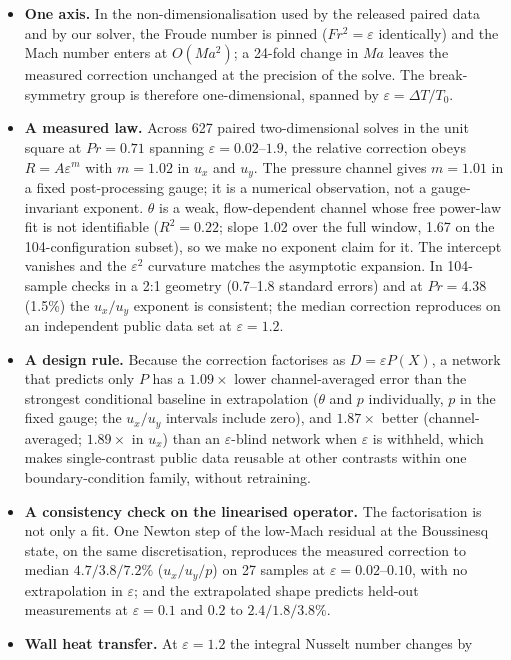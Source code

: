 \documentclass[11pt]{article}
\begin{document}
\begin{itemize}\setlength{\itemsep}{0pt}
\item \textbf{One axis.} In the non-dimensionalisation used by the released paired data and by our
solver, the Froude number is pinned ($Fr^2=\varepsilon$ identically) and the Mach number enters at
$O(Ma^2)$; a 24-fold change in $Ma$ leaves the measured correction unchanged at the precision of
the solve. The
break-symmetry group is therefore one-dimensional, spanned by $\varepsilon=\Delta T/T_0$.
\item \textbf{A measured law.} Across 627 paired two-dimensional solves in the unit square at
$Pr=0.71$ spanning $\varepsilon=0.02$--$1.9$, the relative correction obeys
$R=A\varepsilon^{m}$ with $m=1.02$ in $u_x$ and $u_y$. The pressure channel gives $m=1.01$ in a
fixed post-processing gauge; it is a numerical observation, not a gauge-invariant exponent.
$\theta$ is a weak, flow-dependent channel whose free power-law fit is not identifiable
($R^2=0.22$; slope 1.02 over the full window, 1.67 on the 104-configuration subset), so we make no
exponent claim for it. The intercept vanishes and the
$\varepsilon^2$ curvature matches the asymptotic expansion. In 104-sample checks in a 2:1 geometry
(0.7--1.8 standard errors) and at $Pr=4.38$ (1.5\%) the $u_x/u_y$ exponent is consistent; the median
correction reproduces on an independent public data set at $\varepsilon=1.2$.
\item \textbf{A design rule.} Because the correction factorises as $D=\varepsilon P(X)$, a network
that predicts only $P$ has a $1.09\times$ lower channel-averaged error than the strongest
conditional baseline in extrapolation ($\theta$ and $p$ individually, $p$ in the fixed gauge; the $u_x/u_y$ intervals
include zero), and $1.87\times$ better (channel-averaged; $1.89\times$ in $u_x$) than an
$\varepsilon$-blind network when $\varepsilon$ is
withheld, which makes
single-contrast public data reusable at other contrasts within one boundary-condition family, without
retraining.
\item \textbf{A consistency check on the linearised operator.} The factorisation is not only a fit. One Newton step of the
low-Mach residual at the Boussinesq state, on the same discretisation, reproduces the measured
correction to median $4.7/3.8/7.2\%$ ($u_x/u_y/p$) on 27 samples at $\varepsilon=0.02$--$0.10$,
with no extrapolation in $\varepsilon$; and the extrapolated shape predicts held-out measurements
at $\varepsilon=0.1$ and $0.2$ to $2.4/1.8/3.8\%$.
\item \textbf{Wall heat transfer.} At $\varepsilon=1.2$ the integral Nusselt number changes by

\end{itemize}
\end{document}

